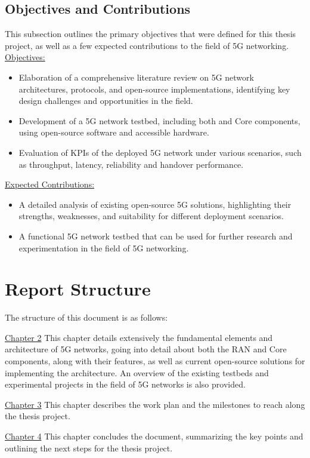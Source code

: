 \subsection{Objectives and Contributions}
\label{sec:objectives_contributions}
This subsection outlines the primary objectives that were defined for this thesis project, as well as a few expected contributions to the field of 5G networking.\\
\underline{Objectives:}
\begin{itemize}
    \item Elaboration of a comprehensive literature review on 5G network architectures, protocols, and open-source implementations, identifying key design challenges and opportunities in the field.
    \item Development of a 5G network testbed, including both  and Core components, using open-source software and accessible hardware.
    \item Evaluation of \glspl{KPI} of the deployed 5G network under various scenarios, such as throughput, latency, reliability and handover performance.
\end{itemize}
\underline{Expected Contributions:}
\begin{itemize}
    \item A detailed analysis of existing open-source 5G solutions, highlighting their strengths, weaknesses, and suitability for different deployment scenarios.
    \item A functional 5G network testbed that can be used for further research and experimentation in the field of 5G networking.
\end{itemize}
\section{Report Structure}
\label{sec:report_structure}
The structure of this document is as follows:
\begin{description}{}
    \item{\uline{Chapter 2}} This chapter details extensively the fundamental elements and architecture of 5G networks, going into detail about both the \gls{RAN} and Core components, along with their features, as well as current open-source solutions for implementing the architecture. An overview of the existing testbeds and experimental projects in the field of 5G networks is also provided. 
    \item{\uline{Chapter 3}} This chapter describes the work plan and the milestones to reach along the thesis project.
    \item{\uline{Chapter 4}} This chapter concludes the document, summarizing the key points and outlining the next steps for the thesis project.
\end{description}
\clearpage